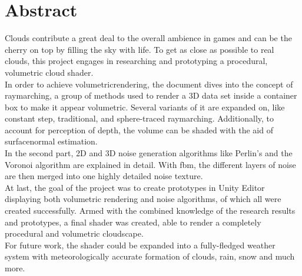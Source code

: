 \section*{Abstract}
Clouds contribute a great deal to the overall ambience in games and can be the cherry on top by filling the sky with life.
To get as close as possible to real clouds, this project engages in researching and prototyping a \gls{procedural}, volumetric cloud shader.
\\
In order to achieve \gls{volumetricrendering}, the document dives into the concept of \gls{raymarching}, a group of methods used to render a 3D data set inside a container box to make it appear volumetric.
Several variants of it are expanded on, like constant step, traditional, and sphere-traced \gls{raymarching}. Additionally, to account for perception of depth, the volume can be shaded with the aid of \gls{surfacenormal} estimation.
\\
In the second part, 2D and 3D \gls{noise} generation algorithms like Perlin's and the Voronoi algorithm are explained in detail. With \gls{fbm}, the different layers of noise are then merged into one highly detailed noise texture.
\\
At last, the goal of the project was to create prototypes in Unity Editor displaying both volumetric rendering and noise algorithms, of which all were created successfully.
Armed with the combined knowledge of the research results and prototypes, a final shader was created, able to render a completely \gls{procedural} and volumetric cloudscape.
\\
For future work, the shader could be expanded into a fully-fledged weather system with meteorologically accurate formation of clouds, rain, snow and much more.